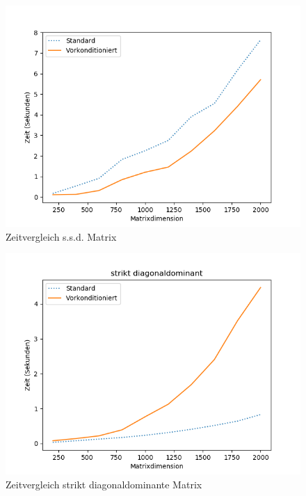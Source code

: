 \begin{figure}
    \centering
    \includegraphics[width=\linewidth]{Aufgabe_1/vcg.png}
    \caption{Zeitvergleich s.s.d. Matrix}
\end{figure}

\begin{figure}
    \centering
    \includegraphics[width=\linewidth]{Aufgabe_1/vcg_strikt.png}
    \caption{Zeitvergleich strikt diagonaldominante Matrix}
\end{figure}
